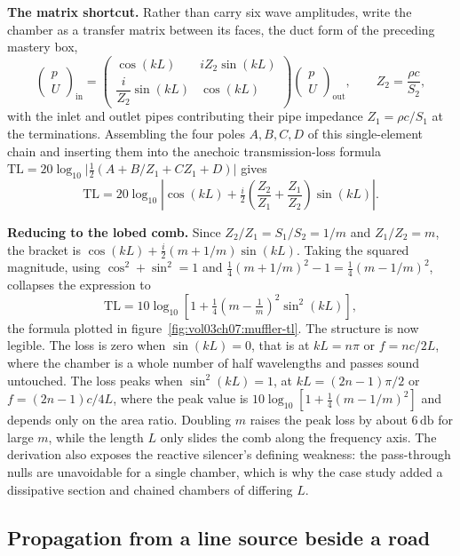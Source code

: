 \textbf{The matrix shortcut.} Rather than carry six wave amplitudes, write
the chamber as a transfer matrix between its faces, the duct form of the
preceding mastery box,
\[
\begin{pmatrix} p \\ U\end{pmatrix}_{\text{in}}
=
\begin{pmatrix} \cos(kL) & iZ_2\sin(kL) \\[2pt]
\dfrac{i}{Z_2}\sin(kL) & \cos(kL)\end{pmatrix}
\begin{pmatrix} p \\ U\end{pmatrix}_{\text{out}},
\qquad Z_2=\frac{\rho c}{S_2},
\]
with the inlet and outlet pipes contributing their pipe impedance
$Z_1=\rho c/S_1$ at the terminations. Assembling the four poles $A,B,C,D$
of this single-element chain and inserting them into the anechoic
transmission-loss formula
$\text{TL}=20\log_{10}\big|\tfrac12(A+B/Z_1+CZ_1+D)\big|$ gives
\[
\text{TL} = 20\log_{10}\!\left|\cos(kL) + \tfrac{i}{2}
            \left(\frac{Z_2}{Z_1}+\frac{Z_1}{Z_2}\right)\sin(kL)\right| .
\]

\textbf{Reducing to the lobed comb.} Since $Z_2/Z_1 = S_1/S_2 = 1/m$ and
$Z_1/Z_2 = m$, the bracket is $\cos(kL)+\tfrac{i}{2}(m+1/m)\sin(kL)$. Taking
the squared magnitude, using $\cos^2+\sin^2=1$ and
$\tfrac14(m+1/m)^2-1=\tfrac14(m-1/m)^2$, collapses the expression to
\[
\text{TL} = 10\log_{10}\!\left[1 + \tfrac14\left(m-\tfrac1m\right)^2
            \sin^2(kL)\right],
\]
the formula plotted in figure~\ref{fig:vol03ch07:muffler-tl}. The structure
is now legible. The loss is zero when $\sin(kL)=0$, that is at
$kL=n\pi$ or $f=nc/2L$, where the chamber is a whole number of half
wavelengths and passes sound untouched. The loss peaks when
$\sin^2(kL)=1$, at $kL=(2n-1)\pi/2$ or $f=(2n-1)c/4L$, where the peak value
is $10\log_{10}[1+\tfrac14(m-1/m)^2]$ and depends only on the area ratio.
Doubling $m$ raises the peak loss by about $6\,\si{\decibel}$ for large
$m$, while the length $L$ only slides the comb along the frequency axis. The
derivation also exposes the reactive silencer's defining weakness: the
pass-through nulls are unavoidable for a single chamber, which is why the
case study added a dissipative section and chained chambers of differing
$L$.

\subsection{Propagation from a line source beside a road}

